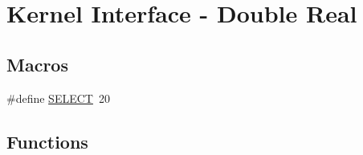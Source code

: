 \hypertarget{group__CORE__double}{}\section{Kernel Interface -\/ Double Real}
\label{group__CORE__double}
\subsection*{Macros}
\begin{DoxyCompactItemize}
\item 
\#define \hyperlink{group__CORE__double_ga53dc4af00adc7b3b4d12eafb71596dfc_ga53dc4af00adc7b3b4d12eafb71596dfc}{S\+E\+L\+E\+C\+T}~20
\end{DoxyCompactItemize}
\subsection*{Functions}
